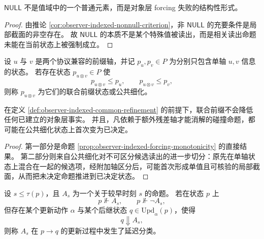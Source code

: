 \begin{proposition}\label{prop:observer-indexed-null-structural}
\(\mathsf{NULL}\) 不是值域中的一个普通元素，而是对象层 forcing 失败的结构性形式。
\end{proposition}

\begin{proof}
由推论 \ref{cor:observer-indexed-nonnull-criterion}，非 \(\mathsf{NULL}\) 的充要条件是局部截面的非空存在。
故 \(\mathsf{NULL}\) 的本质不是某个特殊值被读出，而是相关读出命题未能在当前状态上被强制成立。
\end{proof}

\begin{definition}[多轴前缀与公共细化]\label{def:observer-indexed-common-refinement}
设 \(u\) 与 \(v\) 是两个协议兼容的前缀轴，并记 \(p_u,p_v\in P\) 为分别只包含单轴 \(u,v\) 信息的状态。
若存在状态 \(p_{u\otimes v}\in P\) 使
\[
p_{u\otimes v}\le p_u,
\qquad
p_{u\otimes v}\le p_v,
\]
则称 \(p_{u\otimes v}\) 为它们的联合前缀状态或公共细化。
\end{definition}

\begin{proposition}[多轴前缀提升可断言性]\label{prop:observer-indexed-common-refinement-decidability}
在定义 \ref{def:observer-indexed-common-refinement} 的前提下，联合前缀不会降低任何已建立的对象层事实。
并且，凡依赖于额外残差轴才能消解的碰撞命题，都可能在公共细化状态上首次变为已决定。
\end{proposition}

\begin{proof}
第一部分是命题 \ref{prop:observer-indexed-forcing-monotonicity} 的直接结果。
第二部分则来自公共细化对不可区分候选读出的进一步切分：原先在单轴状态上混合在一起的候选项，经附加轴区分后，可能首次形成单值且可核验的局部截面，从而把未决定命题推进到已决定状态。
\end{proof}

\begin{definition}[延迟分类]\label{def:observer-indexed-delayed-classification}
设 \(s\le \tau(p)\)，且 \(A_s\) 为一个关于较早时刻 \(s\) 的命题。
若在状态 \(p\) 上
\[
p\nVdash A_s,
\qquad
p\nVdash \neg A_s,
\]
但存在某个更新动作 \(\alpha\) 与某个后继状态 \(q\in \mathrm{Upd}_\alpha(p)\)，使得
\[
q\Downarrow A_s,
\]
则称 \(A_s\) 在 \(p\to q\) 的更新过程中发生了延迟分类。
\end{definition}


